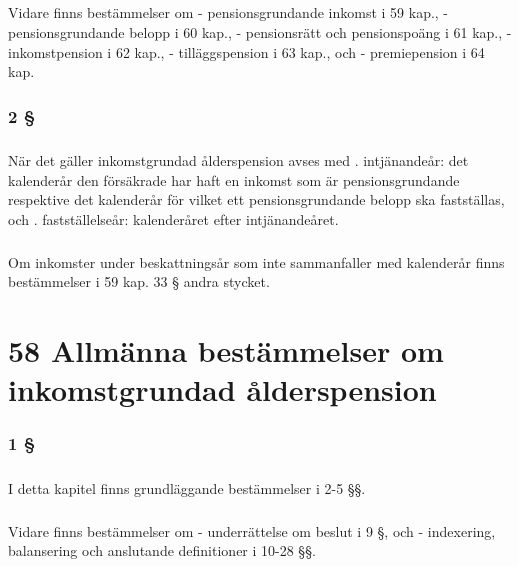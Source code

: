 \documentclass[a4paper,notitlepage,openany,10pt]{book}
\begin{document}
\paragraph*{}
Vidare finns bestämmelser om
\newline - pensionsgrundande inkomst i 59 kap.,
\newline - pensionsgrundande belopp i 60 kap.,
\newline - pensionsrätt och pensionspoäng i 61 kap.,
\newline - inkomstpension i 62 kap.,
\newline - tilläggspension i 63 kap., och
\newline - premiepension i 64 kap.
\subsection*{2 §}
\paragraph*{}
När det gäller inkomstgrundad ålderspension avses med
. intjänandeår: det kalenderår den försäkrade har haft en inkomst som är pensionsgrundande respektive det kalenderår för vilket ett pensionsgrundande belopp ska fastställas, och
. fastställelseår: kalenderåret efter intjänandeåret.
\paragraph*{}
Om inkomster under beskattningsår som inte sammanfaller med kalenderår finns bestämmelser i 59 kap. 33 § andra stycket.
\chapter*{58 Allmänna bestämmelser om inkomstgrundad ålderspension}
\subsection*{1 §}
\paragraph*{}
I detta kapitel finns grundläggande bestämmelser i 2-5 §§.
\paragraph*{}
Vidare finns bestämmelser om
\newline - underrättelse om beslut i 9 §, och
\newline - indexering, balansering och anslutande definitioner i 10-28 §§.
\end{document}
